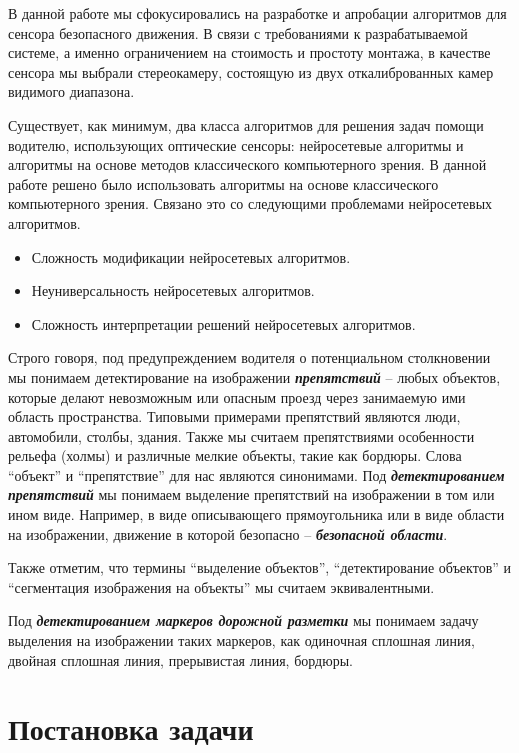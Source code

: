 \documentclass[aps,%
14pt,%
final,%
oneside,
onecolumn,%
musixtex, %
superscriptaddress,%
centertags]{extarticle} %
\begin{document}
В данной работе мы сфокусировались на разработке и апробации алгоритмов для сенсора безопасного движения. В связи с требованиями к разрабатываемой системе, а именно ограничением на стоимость и простоту монтажа, в качестве сенсора мы выбрали стереокамеру, состоящую из двух откалиброванных камер видимого диапазона.

Существует, как минимум, два класса алгоритмов для решения задач помощи водителю, использующих оптические сенсоры: нейросетевые алгоритмы и алгоритмы на основе методов классического компьютерного зрения. В данной работе решено было использовать алгоритмы на основе классического компьютерного зрения. Связано это со следующими проблемами нейросетевых алгоритмов.
\begin{itemize}
\item Сложность модификации нейросетевых алгоритмов.
\item Неуниверсальность нейросетевых алгоритмов.
\item Сложность интерпретации решений нейросетевых алгоритмов.
\end{itemize}

 Строго говоря, под предупреждением водителя о потенциальном столкновении мы понимаем детектирование на изображении \textit{\textbf{препятствий}} -- любых объектов, которые делают невозможным или опасным проезд через занимаемую ими область пространства. Типовыми примерами препятствий являются люди, автомобили, столбы, здания. Также мы считаем препятствиями особенности рельефа (холмы) и различные мелкие объекты, такие как бордюры. Слова ``объект'' и ``препятствие'' для нас являются синонимами. Под \textit{\textbf{детектированием препятствий}} мы понимаем выделение препятствий на изображении в том или ином виде. Например, в виде описывающего прямоугольника или в виде области на изображении, движение в которой безопасно -- \textit{\textbf{безопасной области}}.

Также отметим, что термины ``выделение объектов'', ``детектирование объектов'' и ``сегментация изображения на объекты'' мы считаем эквивалентными.

Под \textit{\textbf{детектированием маркеров дорожной разметки}} мы понимаем задачу выделения на изображении таких маркеров, как одиночная сплошная линия, двойная сплошная линия, прерывистая линия, бордюры.

\newpage

\section{Постановка задачи}
\end{document}
